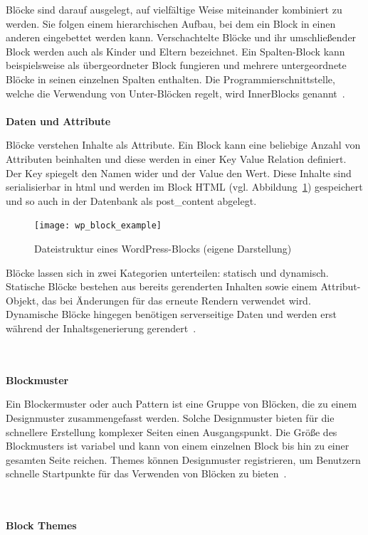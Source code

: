 Blöcke sind darauf ausgelegt, auf vielfältige Weise miteinander kombiniert zu werden.
Sie folgen einem hierarchischen Aufbau, bei dem ein Block in einen anderen eingebettet werden kann.
Verschachtelte Blöcke und ihr umschließender Block werden auch als Kinder und Eltern bezeichnet.
Ein Spalten-Block kann beispielsweise als übergeordneter Block fungieren und mehrere untergeordnete Blöcke in seinen einzelnen Spalten enthalten.
Die Programmierschnittstelle, welche die Verwendung von Unter-Blöcken regelt, wird InnerBlocks genannt~\cite{wordpress2024combination}.
\\\\
\textbf{Daten und Attribute}

Blöcke verstehen Inhalte als Attribute.
Ein Block kann eine beliebige Anzahl von Attributen beinhalten und diese werden in einer Key Value Relation definiert.
Der Key spiegelt den Namen wider und der Value den Wert.
Diese Inhalte sind serialisierbar in \gls{html} und werden im Block HTML (vgl. Abbildung~\ref{fig:wp-block-example}) gespeichert und so auch in der Datenbank als post\_content abgelegt.
\begin{figure}[H]
    \centering
    \texttt{[image: wp\_block\_example]}
    \caption{Dateistruktur eines WordPress-Blocks (eigene Darstellung)}
    \label{fig:wp-block-example}
\end{figure}

Blöcke lassen sich in zwei Kategorien unterteilen: statisch und dynamisch.
Statische Blöcke bestehen aus bereits gerenderten Inhalten sowie einem Attribut-Objekt, das bei Änderungen für das erneute Rendern verwendet wird.
Dynamische Blöcke hingegen benötigen serverseitige Daten und werden erst während der Inhaltsgenerierung gerendert~\cite{wordpress2024dataflow}.




\\\\
\textbf{Blockmuster}

Ein Blockermuster oder auch Pattern ist eine Gruppe von Blöcken, die zu einem Designmuster zusammengefasst werden.
Solche Designmuster bieten für die schnellere Erstellung komplexer Seiten einen Ausgangspunkt.
Die Größe des Blockmusters ist variabel und kann von einem einzelnen Block bis hin zu einer gesamten Seite reichen.
Themes können Designmuster registrieren, um Benutzern schnelle Startpunkte für das Verwenden von Blöcken zu bieten~\cite{wordpress2024blockpattern}.

\\\\
\textbf{Block Themes}

